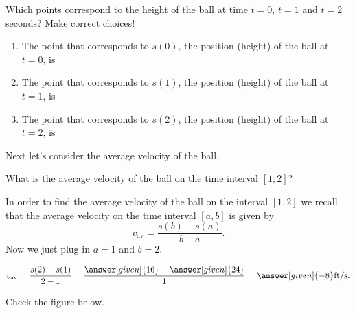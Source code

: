 \documentclass{ximera}
\begin{document}
\begin{example}
\begin {question}
 Which points correspond to the height of the ball at time $t=0$, $t=1$ and $t=2$  seconds? 
Make  correct choices!

\begin{enumerate}
\item The point that corresponds to $s(0)$, the position (height) of the 
ball at $t=0$, is 
\begin{multipleChoice} 
\end{multipleChoice} 
\item The point that corresponds to $s(1)$, the position (height) of the 
ball at $t=1$, is 
\begin{multipleChoice} 
\end{multipleChoice} 


\item The point that corresponds to $s(2)$, the position (height) of the 
ball at $t=2$, is 
\begin{multipleChoice} 
\end{multipleChoice} 
\end{enumerate}
\end {question}

Next let's consider the average velocity of the ball.
\begin{question}
 What is the average velocity of the ball on the time interval $[1,2]$?


\begin{explanation}
In order to find the average velocity of the ball on the 
interval $[1,2]$ we recall that the average velocity on 
the time interval $[a,b]$ is given by
\[
v_{\text{av}} = 
\frac{s(b) - s\left({a}\right)}
{b-a}.
\]
Now we just plug in $a=1$ and $b=2$. 
\end{explanation}
\[
v_{\text{av}} = \frac{s(2)-s(1)}{2-1} = 
\frac{\answer[given]{16} - \answer[given]{24}}{1} =
\answer[given]{-8}\mathrm{ft}/\mathrm{s}.
\] 

Check the figure below.































\end{question}
\end{example}
\end{document}

